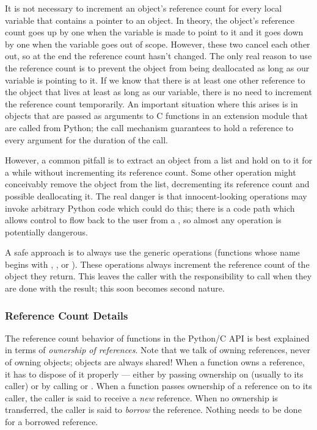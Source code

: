 It is not necessary to increment an object's reference count for every 
local variable that contains a pointer to an object.  In theory, the 
object's reference count goes up by one when the variable is made to 
point to it and it goes down by one when the variable goes out of 
scope.  However, these two cancel each other out, so at the end the 
reference count hasn't changed.  The only real reason to use the 
reference count is to prevent the object from being deallocated as 
long as our variable is pointing to it.  If we know that there is at 
least one other reference to the object that lives at least as long as 
our variable, there is no need to increment the reference count 
temporarily.  An important situation where this arises is in objects 
that are passed as arguments to C functions in an extension module 
that are called from Python; the call mechanism guarantees to hold a 
reference to every argument for the duration of the call.

However, a common pitfall is to extract an object from a list and
hold on to it for a while without incrementing its reference count.
Some other operation might conceivably remove the object from the
list, decrementing its reference count and possible deallocating it.
The real danger is that innocent-looking operations may invoke
arbitrary Python code which could do this; there is a code path which
allows control to flow back to the user from a ,
so almost any operation is potentially dangerous.

A safe approach is to always use the generic operations (functions 
whose name begins with , ,
 or ).  These operations always
increment the reference count of the object they return.  This leaves
the caller with the responsibility to call
 when they are done with the result; this soon
becomes second nature.


\subsubsection{Reference Count Details \label{refcountDetails}}

The reference count behavior of functions in the Python/C API is best 
explained in terms of \emph{ownership of references}.  Note that we 
talk of owning references, never of owning objects; objects are always 
shared!  When a function owns a reference, it has to dispose of it 
properly --- either by passing ownership on (usually to its caller) or 
by calling  or .  When
a function passes ownership of a reference on to its caller, the
caller is said to receive a \emph{new} reference.  When no ownership
is transferred, the caller is said to \emph{borrow} the reference.
Nothing needs to be done for a borrowed reference.

